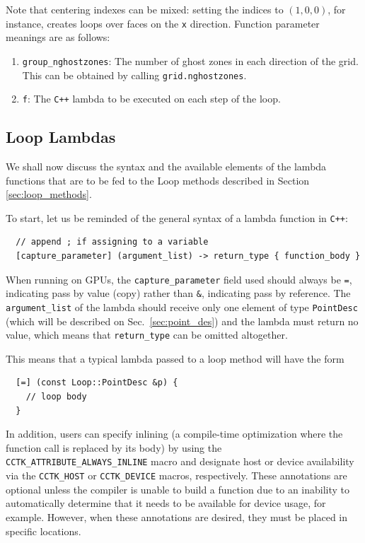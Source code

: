 Note that centering indexes can be mixed: setting the indices to $(1,0,0)$, for instance, creates loops over faces on the \texttt{x} direction. Function parameter meanings are as follows:

\begin{enumerate}
  \item \texttt{group\_nghostzones}: The number of ghost zones in each direction of the grid. This can be obtained by calling \texttt{grid.nghostzones}.
  \item \texttt{f}: The \texttt{C++} lambda to be executed on each step of the loop.
\end{enumerate}

\subsection{Loop Lambdas}

We shall now discuss the syntax and the available elements of the lambda functions that are to be fed to the Loop methods described in Section \ref{sec:loop_methods}.

To start, let us be reminded of the general syntax of a lambda function in \texttt{C++}:

\begin{lstlisting}
  // append ; if assigning to a variable
  [capture_parameter] (argument_list) -> return_type { function_body }
\end{lstlisting}

When running on GPUs, the \texttt{capture\_parameter} field used should always be \texttt{=}, indicating pass by value (copy) rather than \texttt{\&}, indicating pass by reference. The \texttt{argument\_list} of the lambda should receive only one element of type \texttt{PointDesc} (which will be described on Sec.~\ref{sec:point_des}) and the lambda must return no value, which means that \texttt{return\_type} can be omitted altogether.

This means that a typical lambda passed to a loop method will have the form
%
\begin{lstlisting}
  [=] (const Loop::PointDesc &p) {
    // loop body
  }
\end{lstlisting}

In addition, users can specify inlining (a compile-time optimization where the function call is replaced by its body) by using the \texttt{CCTK\_ATTRIBUTE\_ALWAYS\_INLINE} macro and designate host or device availability via the \texttt{CCTK\_HOST} or \texttt{CCTK\_DEVICE} macros, respectively. These annotations are optional unless the compiler is unable to build a function due to an inability to automatically determine that it needs to be available for device usage, for example. However, when these annotations are desired, they must be placed in specific locations.


